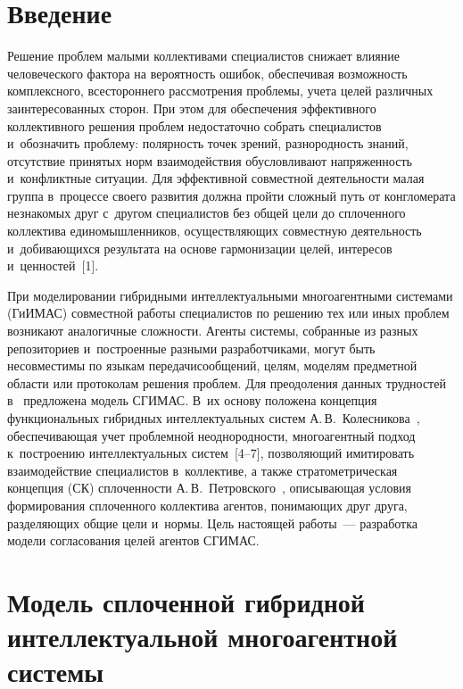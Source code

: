 \begin{multicols}{2}

\label{st\stat}

\section{Введение}

  Решение проблем малыми коллективами специалистов снижает влияние 
человеческого фактора на вероятность ошибок, обеспечивая возможность 
комплексного, всестороннего рассмотрения проб\-ле\-мы, учета целей различных 
заинтересованных сторон. При этом для обеспечения эффективного 
коллективного решения проб\-лем недостаточно собрать специалистов 
и~обозначить проблему: полярность точек зрений, разнородность знаний, 
отсутствие принятых норм взаимодействия обуслов\-ли\-ва\-ют напряженность 
и~конфликтные ситуации. Для эффективной совместной деятельности малая 
группа в~процессе своего развития должна \mbox{пройти} сложный путь от 
конгломерата незнакомых друг с~другом специалистов без общей цели до 
сплоченного коллектива единомышленников, осуществляющих совместную 
деятельность и~добивающихся результата на основе гармонизации целей, 
интересов и~ценностей~[1].
  
  При моделировании гибридными интеллектуальными многоагентными 
системами (\mbox{ГиИМАС}) совместной работы специалистов по решению 
тех или иных проблем возникают аналогичные сложности. Агенты системы, 
собранные из разных репозиториев и~построенные разными разработчиками, 
могут быть несовместимы по языкам передачи\linebreak сообщений, целям, моделям 
предметной области или протоколам решения проблем. Для преодоления 
данных трудностей в~\cite{2-kir} предложена модель \mbox{СГИМАС}. В~их основу 
положена концепция функциональных гибридных интеллектуальных сис\-тем 
А.\,В.~Колесникова~\cite{3-kir}, обеспечивающая учет проб\-лем\-ной 
неоднородности, многоагентный подход к~построению интеллектуальных 
систем~[4--7], позволяющий имитировать взаимодействие специалистов 
в~коллективе, а также стратометрическая концепция (СК) сплоченности 
А.\,В.~Петровского~\cite{8-kir}, описывающая условия формирования 
сплоченного коллектива агентов, понимающих друг друга, разделяющих общие 
цели и~нормы. Цель настоящей работы~--- разработка модели согласования целей 
агентов \mbox{СГИМАС}.
  
\section{Модель сплоченной гибридной интеллектуальной 
многоагентной системы}


\end{multicols}
